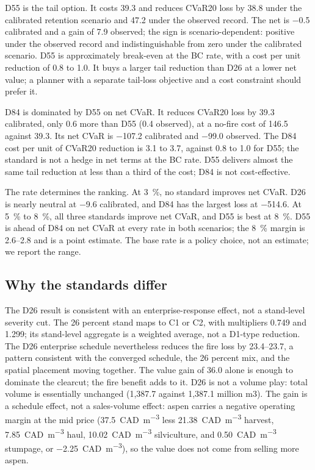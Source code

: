 D55 is the tail option. It costs \SI{39.3}{\millionCAD} and reduces CVaR20 loss by
\SI{38.8}{\millionCAD} under the calibrated retention scenario and \SI{47.2}{\millionCAD} under the
observed record. The net is \SI{-0.5}{\millionCAD} calibrated and a gain of \SI{7.9}{\millionCAD} observed;
the sign is scenario-dependent: positive under the observed record and indistinguishable from zero
under the calibrated scenario. D55 is approximately break-even at the
BC rate, with a cost per unit reduction of 0.8 to 1.0. It buys a larger tail reduction than D26 at a lower net
value; a planner with a separate tail-loss objective and a cost constraint should prefer it.

D84 is dominated by D55 on net CVaR. It reduces CVaR20 loss by \SI{39.3}{\millionCAD} calibrated, only
\SI{0.6}{\millionCAD} more than D55 (\SI{0.4}{\millionCAD} observed), at a no-fire cost of
\SI{146.5}{\millionCAD} against
\SI{39.3}{\millionCAD}. Its net CVaR is \SI{-107.2}{\millionCAD} calibrated and
\SI{-99.0}{\millionCAD} observed. The D84 cost per unit of CVaR20 reduction is 3.1 to 3.7, against 0.8 to 1.0 for D55; the standard
is not a hedge in net terms at the BC rate. D55 delivers
almost the same tail reduction at less than a third of the cost; D84 is not cost-effective.

The rate determines the ranking. At \SI{3}{\percent}, no standard improves net CVaR. D26 is
nearly neutral at \SI{-9.6}{\millionCAD} calibrated, and D84 has the largest loss at
\SI{-514.6}{\millionCAD}. At \SI{5}{\percent} to
\SI{8}{\percent}, all three standards improve net CVaR, and D55 is best at \SI{8}{\percent}. D55 is ahead of D84 on net CVaR at every
rate in both scenarios; the \SI{8}{\percent} margin is \SIrange{2.6}{2.8}{\millionCAD} and is a
point estimate. The base rate is a policy choice, not an estimate; we report the range.

\subsection{Why the standards differ}

The D26 result is consistent with an enterprise-response effect, not a stand-level severity cut. The 26 percent
stand maps to C1 or C2, with multipliers 0.749 and 1.299; its stand-level aggregate is a weighted
average, not a D1-type reduction. The D26 enterprise schedule nevertheless reduces the fire loss by
\SIrange{23.4}{23.7}{\millionCAD}, a pattern consistent with the converged schedule, the 26 percent
mix, and the spatial placement moving together. The value gain of \SI{36.0}{\millionCAD} alone is enough to dominate the
clearcut; the fire benefit adds to it. D26 is not a volume play: total volume is essentially
unchanged (1,387.7 against 1,387.1 million m3). The gain is a schedule effect, not a sales-volume
effect: aspen carries a negative operating margin at the mid price
(\SI{37.5}{CAD\per\cubic\meter} less \SI{21.38}{CAD\per\cubic\meter} harvest,
\SI{7.85}{CAD\per\cubic\meter} haul, \SI{10.02}{CAD\per\cubic\meter} silviculture, and
\SI{0.50}{CAD\per\cubic\meter} stumpage, or \SI{-2.25}{CAD\per\cubic\meter}), so the value
does not come from selling more aspen.

